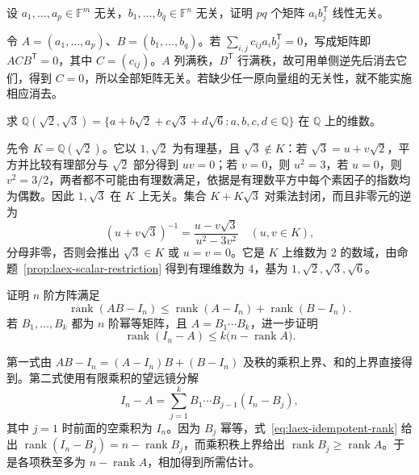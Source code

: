 \begin{example}
\label{ex:laex-outer-products}
设 $a_1,\ldots,a_p\in\mathbb F^m$ 无关，$b_1,\ldots,b_q\in\mathbb F^n$ 无关，证明 $pq$ 个矩阵 $a_ib_j^{\mathsf T}$ 线性无关。
\end{example}

\begin{solve}
令 $A=(a_1,\ldots,a_p)$、$B=(b_1,\ldots,b_q)$。若 $\sum_{i,j}c_{ij}a_ib_j^{\mathsf T}=0$，写成矩阵即 $ACB^{\mathsf T}=0$，其中 $C=(c_{ij})$。$A$ 列满秩，$B^{\mathsf T}$ 行满秩，故可用单侧逆先后消去它们，得到 $C=0$，所以全部矩阵无关。若缺少任一原向量组的无关性，就不能实施相应消去。
\end{solve}

\begin{example}
\label{ex:laex-biquadratic-field}
求 $\mathbb Q(\sqrt2,\sqrt3)=\{a+b\sqrt2+c\sqrt3+d\sqrt6:a,b,c,d\in\mathbb Q\}$ 在 $\mathbb Q$ 上的维数。
\end{example}

\begin{solve}
先令 $K=\mathbb Q(\sqrt2)$。它以 $1,\sqrt2$ 为有理基，且 $\sqrt3\notin K$：若 $\sqrt3=u+v\sqrt2$，平方并比较有理部分与 $\sqrt2$ 部分得到 $uv=0$；若 $v=0$，则 $u^2=3$，若 $u=0$，则 $v^2=3/2$，两者都不可能由有理数满足，依据是有理数平方中每个素因子的指数均为偶数。因此 $1,\sqrt3$ 在 $K$ 上无关。集合 $K+K\sqrt3$ 对乘法封闭，而且非零元的逆为
\[
(u+v\sqrt3)^{-1}=\frac{u-v\sqrt3}{u^2-3v^2}\quad(u,v\in K),
\]
分母非零，否则会推出 $\sqrt3\in K$ 或 $u=v=0$。它是 $K$ 上维数为 $2$ 的数域，由命题~\ref{prop:laex-scalar-restriction} 得到有理维数为 $4$，基为 $1,\sqrt2,\sqrt3,\sqrt6$。
\end{solve}

\begin{example}
\label{ex:laex-telescoping-rank}
证明 $n$ 阶方阵满足
\[
\operatorname{rank}(AB-I_n)
\le\operatorname{rank}(A-I_n)+\operatorname{rank}(B-I_n).
\]
若 $B_1,\ldots,B_k$ 都为 $n$ 阶幂等矩阵，且 $A=B_1\cdots B_k$，进一步证明
\[
\operatorname{rank}(I_n-A)\le k\bigl(n-\operatorname{rank}A\bigr).
\]
\end{example}

\begin{solve}
第一式由 $AB-I_n=(A-I_n)B+(B-I_n)$ 及秩的乘积上界、和的上界直接得到。第二式使用有限乘积的望远镜分解
\[
I_n-A=\sum_{j=1}^k B_1\cdots B_{j-1}(I_n-B_j),
\]
其中 $j=1$ 时前面的空乘积为 $I_n$。因为 $B_j$ 幂等，式~\eqref{eq:laex-idempotent-rank} 给出 $\operatorname{rank}(I_n-B_j)=n-\operatorname{rank}B_j$，而乘积秩上界给出 $\operatorname{rank}B_j\ge\operatorname{rank}A$。于是各项秩至多为 $n-\operatorname{rank}A$，相加得到所需估计。
\end{solve}

